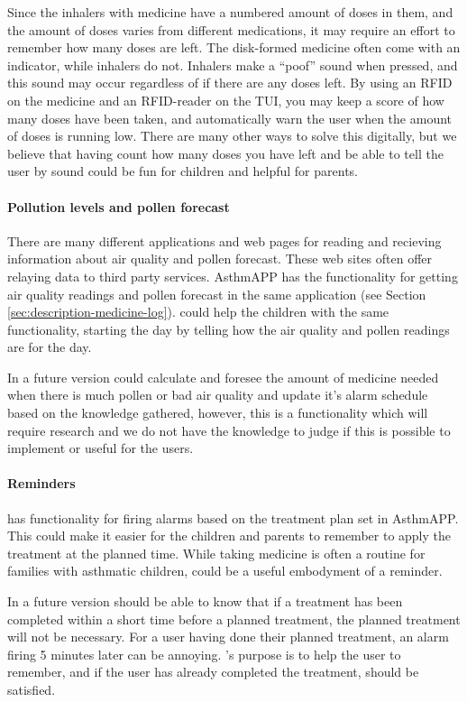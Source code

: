 Since the inhalers with medicine have a numbered amount of doses in them, and the amount of doses varies from different medications, it may require an effort to remember how many doses are left. The disk-formed medicine often come with an indicator, while inhalers do not. Inhalers make a ``poof'' sound when pressed, and this sound may occur regardless of if there are any doses left. By using an RFID on the medicine and an RFID-reader on the TUI, you may keep a score of how many doses have been taken, and automatically warn the user when the amount of doses is running low. There are many other ways to solve this digitally, but we believe that having \buddy{} count how many doses you have left and be able to tell the user by sound could be fun for children and helpful for parents.

\paragraph{Pollution levels and pollen forecast}
There are many different applications and web pages for reading and recieving information about air quality and pollen forecast. These web sites often offer relaying data to third party services. AsthmAPP has the functionality for getting air quality readings and pollen forecast in the same application (see Section \ref{sec:description-medicine-log}).
\buddy{} could help the children with the same functionality, starting the day by telling how the air quality and pollen readings are for the day. 

In a future version \buddy{} could calculate and foresee the amount of medicine needed when there is much pollen or bad air quality and update it's alarm schedule based on the knowledge gathered, however, this is a functionality which will require research and we do not have the knowledge to judge if this is possible to implement or useful for the users. 


\paragraph{Reminders}
\buddy{} has functionality for firing alarms based on the treatment plan set in AsthmAPP. This could make it easier for the children and parents to remember to apply the treatment at the planned time. While taking medicine is often a routine for families with asthmatic children, \buddy{} could be a useful embodyment of a reminder. 

In a future version \buddy{} should be able to know that if a treatment has been completed within a short time before a planned treatment, the planned treatment will not be necessary. For a user having done their planned treatment, an alarm firing 5 minutes later can be annoying. \buddy{}'s purpose is to help the user to remember, and if the user has already completed the treatment, \ab{} should be satisfied. 

